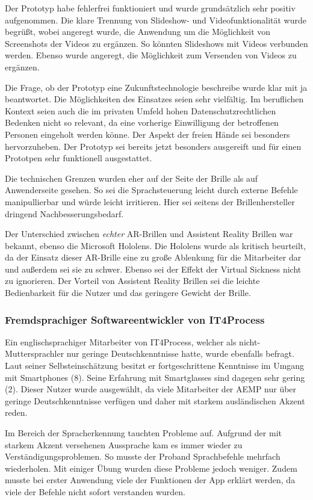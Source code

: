 Der Prototyp habe fehlerfrei funktioniert und wurde grundsätzlich sehr positiv aufgenommen. Die klare Trennung von Slideshow- und Videofunktionalität wurde begrüßt, wobei angeregt wurde, die Anwendung um die Möglichkeit von Screenshots der Videos zu ergänzen. So könnten Slideshows mit Videos verbunden werden. Ebenso wurde angeregt, die Möglichkeit zum Versenden von Videos zu ergänzen.

Die Frage, ob der Prototyp eine Zukunftstechnologie beschreibe wurde klar mit ja beantwortet. Die Möglichkeiten des Einsatzes seien sehr vielfältig. Im beruflichen Kontext seien auch die im privaten Umfeld hohen Datenschutzrechtlichen Bedenken nicht so relevant, da eine vorherige Einwilligung der betroffenen Personen eingeholt werden könne. Der Aspekt der freien Hände sei besonders hervorzuheben. Der Prototyp sei bereits jetzt besonders ausgereift und für einen Prototpen sehr funktionell ausgestattet.

Die technischen Grenzen wurden eher auf der Seite der Brille als auf Anwenderseite gesehen. So sei die Sprachsteuerung leicht durch externe Befehle manipullierbar und würde leicht irritieren. Hier sei seitens der Brillenhersteller dringend Nachbesserungsbedarf. 

Der Unterschied zwischen \emph{echter} AR-Brillen und Assistent Reality Brillen war bekannt, ebenso die Microsoft Hololens. Die Hololens wurde als kritisch beurteilt, da der Einsatz dieser AR-Brille eine zu große Ablenkung für die Mitarbeiter dar und außerdem sei sie zu schwer. Ebenso sei der Effekt der Virtual Sickness nicht zu ignorieren. Der Vorteil von Assistent Reality Brillen sei die leichte Bedienbarkeit für die Nutzer und das geringere Gewicht der Brille.
%
%
\subsubsection{Fremdsprachiger Softwareentwickler von IT4Process}
%
Ein englischsprachiger Mitarbeiter von IT4Process, welcher als nicht-Muttersprachler nur geringe Deutschkenntnisse hatte, wurde ebenfalls befragt. Laut seiner Selbsteinschätzung besitzt er fortgeschrittene Kenntnisse im Umgang mit Smartphones (8). Seine Erfahrung mit Smartglasses sind dagegen sehr gering (2). Dieser Nutzer wurde ausgewählt, da viele Mitarbeiter der AEMP nur über geringe Deutschkenntnisse verfügen und daher mit starkem ausländischen Akzent reden.

Im Bereich der Spracherkennung tauchten Probleme auf. Aufgrund der mit starkem Akzent versehenen Aussprache kam es immer wieder zu Verständigungsproblemen. So musste der Proband Sprachbefehle mehrfach wiederholen. Mit einiger Übung wurden diese Probleme jedoch weniger. Zudem musste bei erster Anwendung viele der Funktionen der App erklärt werden, da viele der Befehle nicht sofort verstanden wurden.

